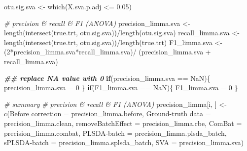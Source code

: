 \documentclass[
]{book}
\newenvironment{Shaded}{\begin{snugshade}}{\end{snugshade}}
\newcommand{\AttributeTok}[1]{\textcolor[rgb]{0.77,0.63,0.00}{#1}}
\newcommand{\CommentTok}[1]{\textcolor[rgb]{0.56,0.35,0.01}{\textit{#1}}}
\newcommand{\ControlFlowTok}[1]{\textcolor[rgb]{0.13,0.29,0.53}{\textbf{#1}}}
\newcommand{\DecValTok}[1]{\textcolor[rgb]{0.00,0.00,0.81}{#1}}
\newcommand{\DocumentationTok}[1]{\textcolor[rgb]{0.56,0.35,0.01}{\textbf{\textit{#1}}}}
\newcommand{\FloatTok}[1]{\textcolor[rgb]{0.00,0.00,0.81}{#1}}
\newcommand{\FunctionTok}[1]{\textcolor[rgb]{0.00,0.00,0.00}{#1}}
\newcommand{\NormalTok}[1]{#1}
\newcommand{\OtherTok}[1]{\textcolor[rgb]{0.56,0.35,0.01}{#1}}
\newcommand{\SpecialCharTok}[1]{\textcolor[rgb]{0.00,0.00,0.00}{#1}}
\newcommand{\StringTok}[1]{\textcolor[rgb]{0.31,0.60,0.02}{#1}}
\begin{document}
\begin{Shaded}
\begin{Highlighting}[]
\NormalTok{  otu.sig.sva }\OtherTok{\textless{}{-}} \FunctionTok{which}\NormalTok{(X.sva.p.adj }\SpecialCharTok{\textless{}=} \FloatTok{0.05}\NormalTok{)}
  
  \CommentTok{\# precision \& recall \& F1 (ANOVA)}
\NormalTok{  precision\_limma.sva }\OtherTok{\textless{}{-}} 
    \FunctionTok{length}\NormalTok{(}\FunctionTok{intersect}\NormalTok{(true.trt, otu.sig.sva))}\SpecialCharTok{/}\FunctionTok{length}\NormalTok{(otu.sig.sva)}
\NormalTok{  recall\_limma.sva }\OtherTok{\textless{}{-}} 
    \FunctionTok{length}\NormalTok{(}\FunctionTok{intersect}\NormalTok{(true.trt, otu.sig.sva))}\SpecialCharTok{/}\FunctionTok{length}\NormalTok{(true.trt)}
\NormalTok{  F1\_limma.sva }\OtherTok{\textless{}{-}} 
\NormalTok{    (}\DecValTok{2}\SpecialCharTok{*}\NormalTok{precision\_limma.sva}\SpecialCharTok{*}\NormalTok{recall\_limma.sva)}\SpecialCharTok{/}
\NormalTok{    (precision\_limma.sva }\SpecialCharTok{+}\NormalTok{ recall\_limma.sva)}
  
  \DocumentationTok{\#\# replace NA value with 0}
  \ControlFlowTok{if}\NormalTok{(precision\_limma.sva }\SpecialCharTok{==} \StringTok{\textquotesingle{}NaN\textquotesingle{}}\NormalTok{)\{}
\NormalTok{    precision\_limma.sva }\OtherTok{=} \DecValTok{0}
\NormalTok{  \}}
  \ControlFlowTok{if}\NormalTok{(F1\_limma.sva }\SpecialCharTok{==} \StringTok{\textquotesingle{}NaN\textquotesingle{}}\NormalTok{)\{}
\NormalTok{    F1\_limma.sva }\OtherTok{=} \DecValTok{0}
\NormalTok{  \}}
  
  
  \CommentTok{\# summary}
  \CommentTok{\# precision \& recall \& F1 (ANOVA)}
\NormalTok{  precision\_limma[i, ] }\OtherTok{\textless{}{-}} \FunctionTok{c}\NormalTok{(}\StringTok{\textasciigrave{}}\AttributeTok{Before correction}\StringTok{\textasciigrave{}} \OtherTok{=}\NormalTok{ precision\_limma.before, }
                            \StringTok{\textasciigrave{}}\AttributeTok{Ground{-}truth data}\StringTok{\textasciigrave{}} \OtherTok{=}\NormalTok{ precision\_limma.clean,}
                            \StringTok{\textasciigrave{}}\AttributeTok{removeBatchEffect}\StringTok{\textasciigrave{}} \OtherTok{=}\NormalTok{ precision\_limma.rbe,}
                            \AttributeTok{ComBat =}\NormalTok{ precision\_limma.combat,}
                            \StringTok{\textasciigrave{}}\AttributeTok{PLSDA{-}batch}\StringTok{\textasciigrave{}} \OtherTok{=}\NormalTok{ precision\_limma.plsda\_batch,}
                            \StringTok{\textasciigrave{}}\AttributeTok{sPLSDA{-}batch}\StringTok{\textasciigrave{}} \OtherTok{=}\NormalTok{ precision\_limma.splsda\_batch,}
                            \AttributeTok{SVA =}\NormalTok{ precision\_limma.sva)}
  

\end{Highlighting}
\end{Shaded}
\end{document}
